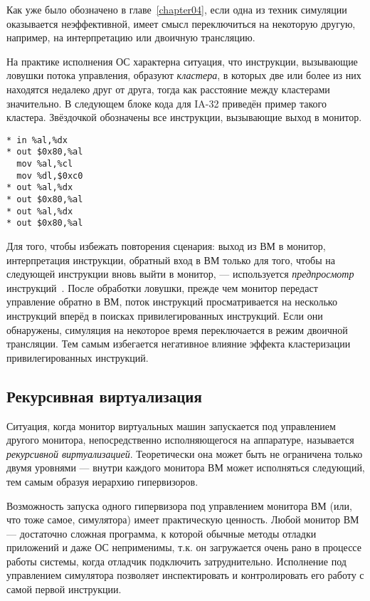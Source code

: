 Как уже было обозначено в главе~\ref{chapter04}, если одна из техник симуляции оказывается неэффективной, имеет смысл переключиться на некоторую другую, например, на интерпретацию или двоичную трансляцию.

На практике исполнения ОС характерна ситуация, что инструкции, вызывающие ловушки потока управления, образуют \emph{кластера}, в которых две или более из них находятся недалеко друг от друга, тогда как расстояние между кластерами значительно. В следующем блоке кода для IA-32 приведён пример такого кластера. Звёздочкой обозначены все инструкции, вызывающие выход в монитор.

\begin{lstlisting}
* in %al,%dx
* out $0x80,%al
  mov %al,%cl
  mov %dl,$0xc0
* out %al,%dx
* out $0x80,%al
* out %al,%dx
* out $0x80,%al
\end{lstlisting}

Для того, чтобы избежать повторения сценария: выход из ВМ в монитор, интерпретация инструкции, обратный вход в ВМ только для того, чтобы на следующей инструкции вновь выйти в монитор, --- используется \textit{предпросмотр} инструкций~\cite{Agesen:2012:STA:2342821.2342856}. После обработки ловушки, прежде чем монитор передаст управление обратно в ВМ, поток инструкций просматривается на несколько инструкций вперёд в поисках привилегированных инструкций. Если они обнаружены, симуляция на некоторое время переключается в режим двоичной трансляции. Тем самым избегается негативное влияние эффекта кластеризации привилегированных инструкций.

\subsection{Рекурсивная виртуализация}

Ситуация, когда монитор виртуальных машин запускается под управлением другого монитора, непосредственно исполняющегося на аппаратуре, называется \textit{рекурсивной виртуализацией}. Теоретически она может быть не ограничена только двумя уровнями --- внутри каждого монитора ВМ может исполняться следующий, тем самым образуя иерархию гипервизоров.

Возможность запуска одного гипервизора под управлением монитора ВМ (или, что тоже самое, симулятора) имеет практическую ценность.  Любой монитор ВМ --- достаточно сложная программа, к которой обычные методы отладки приложений и даже ОС неприменимы, т.к. он загружается очень рано в процессе работы системы, когда отладчик подключить затруднительно. Исполнение под управлением симулятора позволяет инспектировать и контролировать его работу с самой первой инструкции.
 
